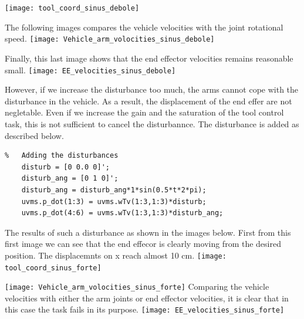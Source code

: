 \documentclass{article}
\begin{document}
\texttt{[image: tool\_coord\_sinus\_debole]}
\centering

The following images compares the vehicle velocities with the joint rotational speed. 
\texttt{[image: Vehicle\_arm\_volocities\_sinus\_debole]}
\centering

Finally, this last image shows that the end effector velocities remains reasonable small. 
\texttt{[image: EE\_velocities\_sinus\_debole]}
\centering
 
However, if we increase the disturbance too much, the arms cannot cope with the disturbance in the vehicle. As a result, the displacement of the end effer are not negletable. Even if we increase the gain and the saturation of the tool control task, this is not sufficient to cancel the disturbannce.  The disturbance is added as described below.
\begin{lstlisting}
%	Adding the disturbances
    disturb = [0 0.0 0]';
    disturb_ang = [0 1 0]';
    disturb_ang = disturb_ang*1*sin(0.5*t*2*pi);
    uvms.p_dot(1:3) = uvms.wTv(1:3,1:3)*disturb;
    uvms.p_dot(4:6) = uvms.wTv(1:3,1:3)*disturb_ang;
\end{lstlisting}
The results of such a disturbance as shown in the images below.
First from this first image we can see that the end effecor is clearly moving from the 
desired position. The displacemnts on x reach almost 10 cm. 
\texttt{[image: tool\_coord\_sinus\_forte]}
\centering

\texttt{[image: Vehicle\_arm\_volocities\_sinus\_forte]}
\centering
Comparing the vehicle velocities with either the arm joints or end effector velocities, it is clear that in this case the task fails in its purpose. 
\texttt{[image: EE\_velocities\_sinus\_forte]}
\centering



















\end{document}
